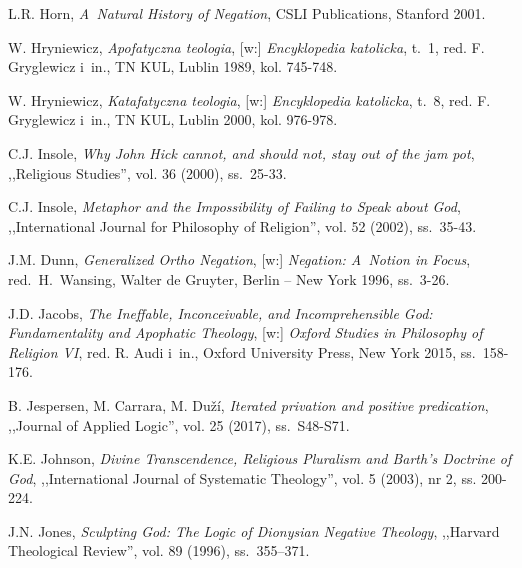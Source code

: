 \begin{thebibliography}{100}
L.R. Horn, \textit{A~Natural History of Negation}, CSLI Publications, Stanford 2001.

W. Hryniewicz, \textit{Apofatyczna teologia}, [w:] \textit{Encyklopedia katolicka}, t.~1, red. F. Gryglewicz i~in., TN KUL, Lublin 1989, kol. 745-748.

W. Hryniewicz, \textit{Katafatyczna teologia}, [w:] \textit{Encyklopedia katolicka}, t.~8, red. F. Gryglewicz i~in., TN KUL, Lublin 2000, kol. 976-978.

C.J. Insole, \textit{Why John Hick cannot, and should not, stay out of the jam pot}, ,,Religious Studies'', vol. 36 (2000), ss.~25-33.

C.J. Insole, \textit{Metaphor and the Impossibility of Failing to Speak about God}, ,,International Journal for Philosophy of Religion'', vol. 52 (2002), ss.~35-43.

J.M. Dunn, \textit{Generalized Ortho Negation}, [w:] \textit{Negation: A~Notion in Focus}, red.~H.~Wansing, Walter de Gruyter, Berlin -- New York 1996, ss.~3-26.

J.D. Jacobs, \textit{The Ineffable, Inconceivable, and Incomprehensible God: Fundamentality and Apophatic Theology},
[w:] \textit{Oxford Studies in Philosophy of Religion VI}, red. R. Audi i~in., Oxford University Press, New York 2015, ss.~158-176.

B. Jespersen, M. Carrara, M. Duží, \textit{Iterated privation and positive predication}, ,,Journal of Applied Logic'', vol. 25 (2017), ss.~S48-S71.


K.E. Johnson, \textit{Divine Transcendence, Religious Pluralism and Barth's Doctrine of God}, ,,International Journal of Systematic Theology'', vol. 5 (2003), nr 2, ss. 200-224.

J.N. Jones, \textit{Sculpting God: The Logic of Dionysian Negative Theology}, ,,Harvard Theological Review'', vol. 89 (1996), ss.~355–371.


\end{thebibliography}
